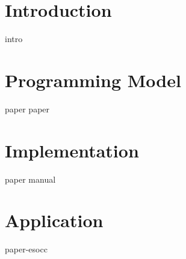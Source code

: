 \documentclass[%
   paper=A4,               %
   twoside=true,           %
   openright,              %
   parskip=full,           %
   chapterprefix=true,        %
   11pt,                %
   headings=normal,        %
   bibliography=totoc,        %
   listof=totoc,           %
   titlepage=on,           %
   captions=tableabove,    %
   draft=false,            %
]{scrreprt}%
\begin{document}
\pagestyle{empty}          
% 
    
\cleardoublepage

\pagestyle{plain}          
      
\cleardoublepage
%
 
\cleardoublepage
%
\setcounter{tocdepth}{2}      
\tableofcontents           
\cleardoublepage

\setcounter{page}{1}       %
\pagestyle{maincontentstyle}  %

\part[Introduction]{Introduction}\label{p:intro}
{intro}
\clearpage

\part[Programming Model]{Programming Model}\label{p:model}
{paper}
{paper}
\clearpage

\part[Implementation]{Implementation}\label{p:impl}
{paper}
{manual}
\clearpage

\part[Application]{Application}\label{p:app}
{paper-esocc}
\clearpage

\cleardoublepage

{%
\renewcommand{\bibfont}{\normalfont\small}
\setlength{\biblabelsep}{5pt}
\setlength{\bibitemsep}{0.5\baselineskip plus 0.5\baselineskip}
\printbibliography
}
\cleardoublepage
\end{document}
